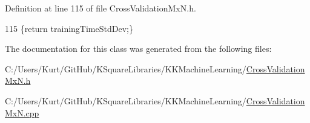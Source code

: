 Definition at line 115 of file Cross\+Validation\+Mx\+N.\+h.


\begin{DoxyCode}
115 \{\textcolor{keywordflow}{return} trainingTimeStdDev;\}
\end{DoxyCode}


The documentation for this class was generated from the following files\+:\begin{DoxyCompactItemize}
\item 
C\+:/\+Users/\+Kurt/\+Git\+Hub/\+K\+Square\+Libraries/\+K\+K\+Machine\+Learning/\hyperlink{_cross_validation_mx_n_8h}{Cross\+Validation\+Mx\+N.\+h}\item 
C\+:/\+Users/\+Kurt/\+Git\+Hub/\+K\+Square\+Libraries/\+K\+K\+Machine\+Learning/\hyperlink{_cross_validation_mx_n_8cpp}{Cross\+Validation\+Mx\+N.\+cpp}\end{DoxyCompactItemize}
